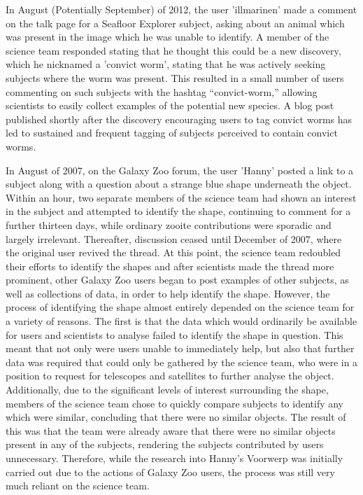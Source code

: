 \documentclass{sigchi}
\begin{document}
In August (Potentially September) of 2012, the user 'illmarinen' made a comment on the talk page for a Seafloor Explorer subject, asking about an animal which was present in the image which he was unable to identify. A member of the science team responded stating that he thought this could be a new discovery, which he nicknamed a 'convict worm', stating that he was actively seeking subjects where the worm was present. This resulted in a small number of users commenting on such subjects with the hashtag “convict-worm,” allowing scientists to easily collect examples of the potential new species. A blog post published shortly after the discovery encouraging users to tag convict worms has led to sustained and frequent tagging of subjects perceived to contain convict worms.

	
In August of 2007, on the Galaxy Zoo forum, the user 'Hanny' posted a link to a subject along with a question about a strange blue shape underneath the object. Within an hour, two separate members of the science team had shown an interest in the subject and attempted to identify the shape, continuing to comment for a further thirteen days, while ordinary zooite contributions were sporadic and largely irrelevant. Thereafter, discussion ceased until December of 2007, where the original user revived the thread. At this point, the science team redoubled their efforts to identify the shapes and after scientists made the thread more prominent, other Galaxy Zoo users began to post examples of other subjects, as well as collections of data, in order to help identify the shape. However, the process of identifying the shape almost entirely depended on the science team for a variety of reasons. 
The first is that the data which would ordinarily be available for users and scientists to analyse failed to identify the shape in question. This meant that not only were users unable to immediately help, but also that further data was required that could only be gathered by the science team, who were in a position to request for telescopes and satellites to further analyse the object. Additionally, due to the significant levels of interest surrounding the shape, members of the science team chose to quickly compare subjects to identify any which were similar, concluding that there were no similar objects. The result of this was that the team were already aware that there were no similar objects present in any of the subjects, rendering the subjects contributed by users unnecessary. Therefore, while the research into Hanny's Voorwerp was initially carried out due to the actions of Galaxy Zoo users, the process was still very much reliant on the science team.
\end{document}

